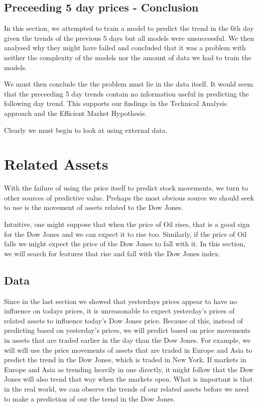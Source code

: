 \documentclass{report}
\begin{document}
\subsection{Preceeding 5 day prices - Conclusion}

In this section, we attempted to train a model to predict the trend in the 6th day given the trends of the previous 5 days but all models were unsuccessful. We then analysed why they might have failed and concluded that it was a problem with neither the complexity of the models nor the amount of data we had to train the models.

We must then conclude the the problem must lie in the data itself. It would seem that the preceeding 5 day trends contain no information useful in predicting the following day trend. This supports our findings in the Technical Analysis approach and the Efficient Market Hypothesis.

Clearly we must begin to look at using external data.

\clearpage
\section{Related Assets}

With the failure of using the price itself to predict stock movements, we turn to other sources of predictive value. Prehaps the most obvious source we should seek to use is the movement of assets related to the Dow Jones.

Intuitive, one might suppose that when the price of Oil rises, that is a good sign for the Dow Jones and we can expect it to rise too. Similarly, if the price of Oil falls we might expect the price of the Dow Jones to fall with it. In this section, we will search for features that rise and fall with the Dow Jones index.

\subsection{Data}

Since in the last section we showed that yesterdays prices appear to have no influence on todays prices, it is unreasonable to expect yesterday's prices of related assets to influence today's Dow Jones price. Because of this, instead of predicting based on yesterday's prices, we will predict based on price movements in assets that are traded earlier in the day than the Dow Jones. For example, we will will use the price movements of assets that are traded in Europe and Asia to predict the trend in the Dow Jones, which is traded in New York. If markets in Europe and Asia as trending heavily in one directly, it might follow that the Dow Jones will also trend that way when the markets open. What is important is that in the real world, we can observe the trends of our related assets before we need to make a prediction of our the trend in the Dow Jones.
\end{document}

